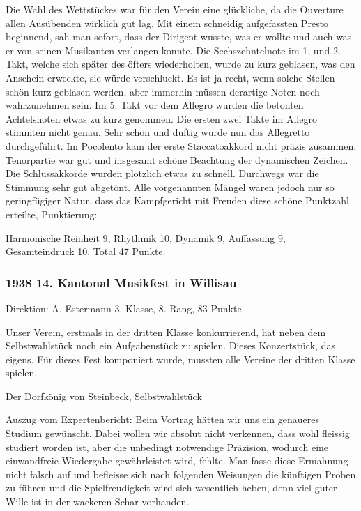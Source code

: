 \begin{history}
    Die Wahl des Wettstückes war für den Verein eine glückliche, da die
    Ouverture allen Ausübenden wirklich gut lag. Mit einem schneidig
    aufgefassten Presto beginnend, sah man sofort, dass der Dirigent wusste, was
    er wollte und auch was er von seinen Musikanten verlangen konnte. Die
    Sechszehntelnote im 1. und 2. Takt, welche sich später des öfters
    wiederholten, wurde zu kurz geblasen, was den Anschein erweckte, sie würde
    verschluckt. Es ist ja recht, wenn solche Stellen schön kurz geblasen
    werden, aber immerhin müssen derartige Noten noch wahrzunehmen sein. Im 5.
    Takt vor dem Allegro wurden die betonten Achtelsnoten etwas zu kurz
    genommen. Die ersten zwei Takte im Allegro stimmten nicht genau. Sehr schön
    und duftig wurde nun das Allegretto durchgeführt. Im Pocolento kam der erste
    Staccatoakkord nicht präzis zusammen. Tenorpartie war gut und insgesamt
    schöne Beachtung der dynamischen Zeichen. Die Schlussakkorde wurden
    plötzlich etwas zu schnell. Durchwegs war die Stimmung sehr gut abgetönt.
    Alle vorgenannten Mängel waren jedoch nur so geringfügiger Natur, dass das
    Kampfgericht mit Freuden diese schöne Punktzahl erteilte, Punktierung:

    Harmonische Reinheit 9, Rhythmik 10, Dynamik 9, Auffassung 9, Gesamteindruck
    10, Total 47 Punkte.



    \subsubsection*{1938 14. Kantonal Musikfest in Willisau}

    Direktion: A. Estermann 3. Klasse, 8. Rang, 83 Punkte

    Unser Verein, erstmals in der dritten Klasse konkurrierend, hat neben dem
    Selbstwahlstück noch ein Aufgabenstück zu spielen. Dieses Konzertstück, das
    eigens. Für dieses Fest komponiert wurde, mussten alle Vereine der dritten
    Klasse spielen.

    Der Dorfkönig von Steinbeck, Selbstwahlstück

    Auszug vom Expertenbericht: Beim Vortrag hätten wir uns ein genaueres
    Studium gewünscht. Dabei wollen wir absolut nicht verkennen, dass wohl
    fleissig studiert worden ist, aber die unbedingt notwendige Präzision,
    wodurch eine einwandfreie Wiedergabe gewährleistet wird, fehlte. Man fasse
    diese Ermahnung nicht falsch auf und befleisse sich nach folgenden Weisungen
    die künftigen Proben zu führen und die Spielfreudigkeit wird sich wesentlich
    heben, denn viel guter Wille ist in der wackeren Schar vorhanden.


\end{history}

